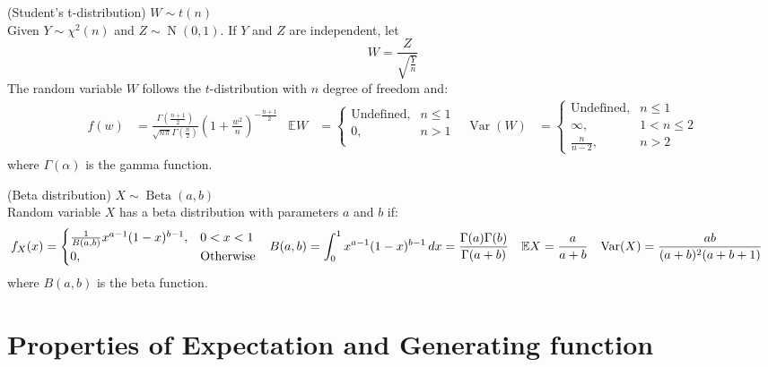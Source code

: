\documentclass{huhtakm-template-book}
\newcommand{\expect}{\mathbb{E}}
\DeclareMathOperator{\N}{N}
\DeclareMathOperator{\Beta}{Beta}
\DeclareMathOperator{\Var}{Var}
\begin{document}
\begin{seg}(Student's t-distribution) $W\sim t(n)$\\
	Given $Y\sim\chi^{2}(n)$ and $Z\sim\N(0,1)$. If $Y$ and $Z$ are independent, let
	\begin{equation*}
		W=\frac{Z}{\sqrt{\frac{Y}{n}}}
	\end{equation*}
	The random variable $W$ follows the $t$-distribution with $n$ degree of freedom and:
	\begin{align*}
		f(w)&=\frac{\Gamma\left(\frac{n+1}{2}\right)}{\sqrt{n\pi}\Gamma\left(\frac{n}{2}\right)}\left(1+\frac{w^{2}}{n}\right)^{-\frac{n+1}{2}} & \expect{W}&=\begin{cases}
			\text{Undefined}, &n\leq 1\\
			0, &n>1\\
		\end{cases} & \Var(W)&=\begin{cases}
			\text{Undefined}, &n\leq 1\\
			\infty, &1<n\leq 2\\
			\frac{n}{n-2}, &n>2
		\end{cases}
	\end{align*}
	where $\Gamma(\alpha)$ is the gamma function.
\end{seg}
\begin{seg}(Beta distribution) $X\sim\Beta(a,b)$\\
	Random variable $X$ has a beta distribution with parameters $a$ and $b$ if:
	\begin{align*}
		f_{X}(x)&=\begin{cases}
			\frac{1}{B(a,b)}x^{a-1}(1-x)^{b-1}, &0<x<1\\
			0, &\text{Otherwise}
		\end{cases} & B(a,b)&=\intlu{0}{1}x^{a-1}(1-x)^{b-1}\,dx=\frac{\Gamma(a)\Gamma(b)}{\Gamma(a+b)} & \expect{X}&=\frac{a}{a+b} & \Var(X)&=\frac{ab}{(a+b)^{2}(a+b+1)}
	\end{align*}
	where $B(a,b)$ is the beta function.
\end{seg}

\chapter{Properties of Expectation and Generating function}
\end{document}
